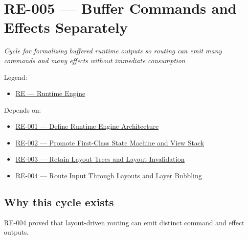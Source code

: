 \chapter{RE-005 --- Buffer Commands and Effects Separately}\label{record-153}

\smallskip

\emph{Cycle for formalizing buffered runtime outputs so routing can emit many commands and many effects without immediate consumption}

Legend:

\begin{itemize}
\tightlist
\item
  \href{https://github.com/flyingrobots/bijou/blob/1853ad902f6bf219326409e7f743a5a1d6517dbc/docs/legends/RE-runtime-engine.md}{RE --- Runtime Engine}
\end{itemize}

Depends on:

\begin{itemize}
\tightlist
\item
  \href{https://github.com/flyingrobots/bijou/blob/cbd70612140e7a450d764b3c7be1c6af878b99bc/docs/design/RE-001-define-runtime-engine-architecture.md}{RE-001 --- Define Runtime Engine Architecture}
\item
  \href{https://github.com/flyingrobots/bijou/blob/cbd70612140e7a450d764b3c7be1c6af878b99bc/docs/design/RE-002-promote-first-class-state-machine-and-view-stack.md}{RE-002 --- Promote First-Class State Machine and View Stack}
\item
  \href{https://github.com/flyingrobots/bijou/blob/cbd70612140e7a450d764b3c7be1c6af878b99bc/docs/design/RE-003-retain-layout-trees-and-layout-invalidation.md}{RE-003 --- Retain Layout Trees and Layout Invalidation}
\item
  \href{https://github.com/flyingrobots/bijou/blob/cbd70612140e7a450d764b3c7be1c6af878b99bc/docs/design/RE-004-route-input-through-layouts-and-layer-bubbling.md}{RE-004 --- Route Input Through Layouts and Layer Bubbling}
\end{itemize}

\section{Why this cycle exists}\label{record-153-why-this-cycle-exists}

RE-004 proved that layout-driven routing can emit distinct command and effect outputs.

